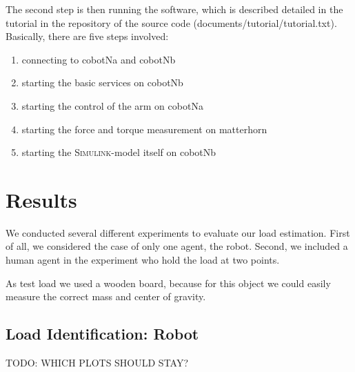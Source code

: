 The second step is then running the software, which is described detailed in the tutorial in the repository of the source code (documents/tutorial/tutorial.txt). Basically, there are five steps involved:
\begin{enumerate}
	\item connecting to cobotNa and cobotNb
	\item starting the basic services on cobotNb
	\item starting the control of the arm on cobotNa
	\item starting the force and torque measurement on matterhorn
	\item starting the \textsc{Simulink}-model itself on cobotNb
\end{enumerate}

\section{Results}

We conducted several different experiments to evaluate our load estimation. First of all, we considered the case of only one agent, the robot. Second, we included a human agent in the experiment who hold the load at two points.

As test load we used a wooden board, because for this object we could easily measure the correct mass and center of gravity.

\subsection{Load Identification: Robot}

TODO: WHICH PLOTS SHOULD STAY?

